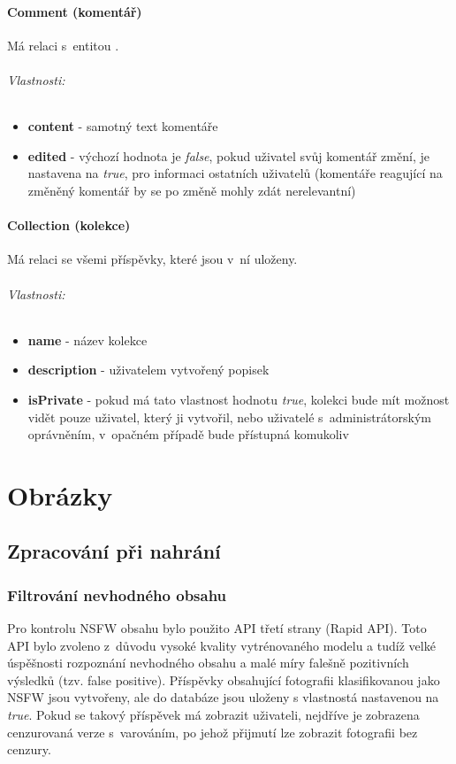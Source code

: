 \documentclass[12pt, a4paper,
  oneside,      %
]{report}
\newenvironment{propertiesItemize}{
\begin{itemize}{ 
  }}
  {\end{itemize}}
\begin{document}
\subsubsection{Comment (komentář)} Má relaci  s~entitou .
\subparagraph{Vlastnosti:}
\begin{propertiesItemize}
	\item \textbf{content} - samotný text komentáře
	\item \textbf{edited} - výchozí hodnota je \textit{false}, pokud uživatel svůj komentář změní, je nastavena na \textit{true}, pro informaci ostatních uživatelů (komentáře reagující na změněný komentář by se po změně mohly zdát nerelevantní)
\end{propertiesItemize}
\subsubsection{Collection (kolekce)} Má relaci  se všemi příspěvky, které jsou v~ní uloženy.
\subparagraph{Vlastnosti:}
\begin{propertiesItemize}
	\item \textbf{name} - název kolekce
	\item \textbf{description} - uživatelem vytvořený popisek
	\item \textbf{isPrivate} - pokud má tato vlastnost hodnotu \textit{true}, kolekci bude mít možnost vidět pouze uživatel, který ji vytvořil, nebo uživatelé s~administrátorským oprávněním, v~opačném případě bude přístupná komukoliv
\end{propertiesItemize}

\chapter{Obrázky}
\section{Zpracování při nahrání}
\subsection{Filtrování nevhodného obsahu}\label{section:nsfw_filter}
Pro kontrolu NSFW obsahu bylo použito API třetí strany (Rapid API). Toto API bylo zvoleno z~důvodu vysoké kvality vytrénovaného modelu a tudíž velké úspěšnosti rozpoznání nevhodného obsahu a malé míry falešně pozitivních výsledků (tzv. false positive). Příspěvky obsahující fotografii klasifikovanou jako NSFW jsou vytvořeny, ale do databáze jsou uloženy s vlastnostá  nastavenou na \textit{true}. Pokud se takový příspěvek má zobrazit uživateli, nejdříve je zobrazena cenzurovaná verze s~varováním, po jehož přijmutí lze zobrazit fotografii bez cenzury.
\end{document}
